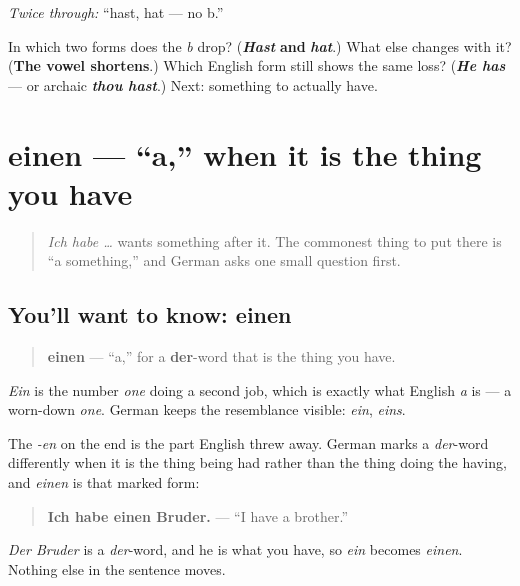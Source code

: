\emph{Twice through:} \textquotedblleft{}hast, hat — no b.\textquotedblright{}

\begin{tcolorbox}[breakable,colback=teal!4,colframe=teal!35!black,title={Before you move on}]
In which two forms does the \emph{b} drop? (\emph{\textbf{Hast}} \textbf{and} \emph{\textbf{hat}}.) What else changes with it? (\textbf{The vowel shortens}.) Which English form still shows the same loss? (\emph{\textbf{He has}} — or archaic \emph{\textbf{thou hast}}.) Next: something to actually have.
\end{tcolorbox}
\section[einen]{einen — \textquotedblleft{}a,\textquotedblright{} when it is the thing you have}

\label{lesson:GE-C14-einen}



\begin{quote}
\emph{Ich habe …} wants something after it. The commonest thing to put there is \textquotedblleft{}a something,\textquotedblright{} and German asks one small question first.
\end{quote}

\subsection*{You'll want to know: einen}
\begin{quote}
\textbf{einen} — \textquotedblleft{}a,\textquotedblright{} for a \textbf{der}-word that is the thing you have.
\end{quote}

\emph{Ein} is the number \emph{one} doing a second job, which is exactly what English \emph{a} is — a worn-down \emph{one}. German keeps the resemblance visible: \emph{ein}, \emph{eins}.

The \emph{-en} on the end is the part English threw away. German marks a \emph{der}-word differently when it is the thing being had rather than the thing doing the having, and \emph{einen} is that marked form:

\begin{quote}
\textbf{Ich habe einen Bruder.} — \textquotedblleft{}I have a brother.\textquotedblright{}
\end{quote}

\emph{Der Bruder} is a \emph{der}-word, and he is what you have, so \emph{ein} becomes \emph{einen}. Nothing else in the sentence moves.

